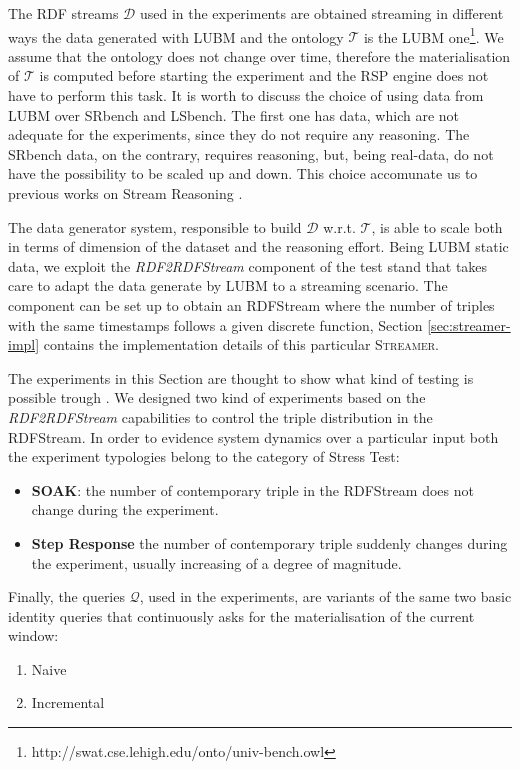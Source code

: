 The RDF streams  $\mathcal{D}$ used in the experiments are obtained streaming in different ways the data generated with LUBM  \cite{Guo2005} and the ontology $\mathcal{T}$ is the LUBM one\footnote{http://swat.cse.lehigh.edu/onto/univ-bench.owl}. We assume that the ontology does not change over time, therefore the materialisation of $\mathcal{T}$ is computed before starting the experiment and the RSP engine does not have to perform this task. It is worth to discuss the choice of using data from LUBM over SRbench and LSbench. The first one has data, which are not adequate for the experiments, since they do not require any reasoning. The SRbench data, on the contrary, requires reasoning, but, being real-data, do not have the possibility to be scaled up and down. This choice accomunate us to previous works on Stream Reasoning \cite{DBLP:conf/semweb/UrbaniMJHB13}. 

The data generator system, responsible to build $\mathcal{D}$ w.r.t. $\mathcal{T}$, is able to scale both in terms of dimension of the dataset and the reasoning effort. Being LUBM static data, we exploit the \textit{RDF2RDFStream} component of the test stand that takes care to adapt the data generate by LUBM to a streaming scenario. The component can be set up to obtain an RDFStream where the number of triples with the same timestamps follows a given discrete function, Section \ref{sec:streamer-impl} contains the implementation details of this particular \textsc{Streamer}. %

The experiments in this Section are thought to show what kind of testing is possible trough \namens. We designed two kind of experiments based on the \textit{RDF2RDFStream} capabilities to control the triple distribution in the RDFStream. In order to evidence system dynamics over a particular input both the experiment typologies belong to the category of Stress Test:
\begin{itemize}
\item \textbf{SOAK}: the number of contemporary triple in the RDFStream does not change during the experiment.
\item \textbf{Step Response} the number of contemporary triple suddenly changes during the experiment, usually increasing of a degree of magnitude.
\end{itemize}
 
Finally, the queries $\mathcal{Q}$, used in the experiments, are variants of the same two basic identity queries that continuously asks for the materialisation of the current window:
\begin{enumerate}
\item[Q.1] Naive
\item[Q.2] Incremental
\end{enumerate}
 		 

